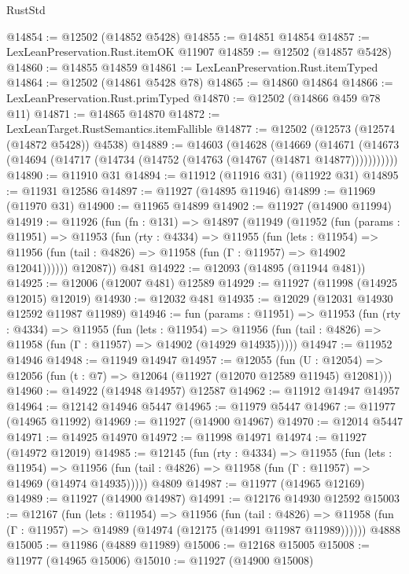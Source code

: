 \begin{lexlean}{RustStd}
\begin{coremodule}
@14854 := @12502 (@14852 @5428)
@14855 := @14851 @14854
@14857 := LexLeanPreservation.Rust.itemOK @11907
@14859 := @12502 (@14857 @5428)
@14860 := @14855 @14859
@14861 := LexLeanPreservation.Rust.itemTyped
@14864 := @12502 (@14861 @5428 @78)
@14865 := @14860 @14864
@14866 := LexLeanPreservation.Rust.primTyped
@14870 := @12502 (@14866 @459 @78 @11)
@14871 := @14865 @14870
@14872 := LexLeanTarget.RustSemantics.itemFallible
@14877 := @12502 (@12573 (@12574 (@14872 @5428)) @4538)
@14889 := @14603
    (@14628
      (@14669
        (@14671 (@14673 (@14694 (@14717 (@14734 (@14752 (@14763 (@14767 (@14871 @14877)))))))))))
@14890 := @11910 @31
@14894 := @11912 (@11916 @31) (@11922 @31)
@14895 := @11931 @12586
@14897 := @11927 (@14895 @11946)
@14899 := @11969 (@11970 @31)
@14900 := @11965 @14899
@14902 := @11927 (@14900 @11994)
@14919 := @11926
    (fun (fn : @131) =>
    @14897
      (@11949
        (@11952
          (fun (params : @11951) =>
          @11953
            (fun (rty : @4334) =>
            @11955
              (fun (lets : @11954) =>
              @11956 (fun (tail : @4826) => @11958 (fun (Γ : @11957) => @14902 @12041))))))
        @12087))
    @481
@14922 := @12093 (@14895 (@11944 @481))
@14925 := @12006 (@12007 @481) @12589
@14929 := @11927 (@11998 (@14925 @12015) @12019)
@14930 := @12032 @481
@14935 := @12029 (@12031 @14930 @12592 @11987 @11989)
@14946 := fun (params : @11951) =>
  @11953
    (fun (rty : @4334) =>
    @11955
      (fun (lets : @11954) =>
      @11956 (fun (tail : @4826) => @11958 (fun (Γ : @11957) => @14902 (@14929 @14935)))))
@14947 := @11952 @14946
@14948 := @11949 @14947
@14957 := @12055
    (fun (U : @12054) => @12056 (fun (t : @7) => @12064 (@11927 (@12070 @12589 @11945) @12081)))
@14960 := @14922 (@14948 @14957) @12587
@14962 := @11912 @14947 @14957
@14964 := @12142 @14946 @5447
@14965 := @11979 @5447
@14967 := @11977 (@14965 @11992)
@14969 := @11927 (@14900 @14967)
@14970 := @12014 @5447
@14971 := @14925 @14970
@14972 := @11998 @14971
@14974 := @11927 (@14972 @12019)
@14985 := @12145
    (fun (rty : @4334) =>
    @11955
      (fun (lets : @11954) =>
      @11956 (fun (tail : @4826) => @11958 (fun (Γ : @11957) => @14969 (@14974 @14935)))))
    @4809
@14987 := @11977 (@14965 @12169)
@14989 := @11927 (@14900 @14987)
@14991 := @12176 @14930 @12592
@15003 := @12167
    (fun (lets : @11954) =>
    @11956
      (fun (tail : @4826) =>
      @11958 (fun (Γ : @11957) => @14989 (@14974 (@12175 (@14991 @11987 @11989))))))
    @4888
@15005 := @11986 (@4889 @11989)
@15006 := @12168 @15005
@15008 := @11977 (@14965 @15006)
@15010 := @11927 (@14900 @15008)

\end{coremodule}
\end{lexlean}
